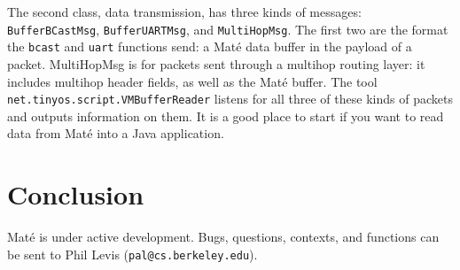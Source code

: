 \documentclass[12pt]{article}
\newcommand{\mate}{Mat\'{e}\xspace}
\begin{document}
The second class, data transmission, has three kinds of messages: {\tt
BufferBCastMsg}, {\tt BufferUARTMsg}, and {\tt MultiHopMsg}. The first
two are the format the {\tt bcast} and {\tt uart} functions send: a
\mate data buffer in the payload of a packet. MultiHopMsg is for
packets sent through a multihop routing layer: it includes multihop
header fields, as well as the \mate buffer. The tool {\tt
net.tinyos.script.VMBufferReader} listens for all three of these kinds
of packets and outputs information on them. It is a good place to
start if you want to read data from \mate into a Java application.


\section{Conclusion}

\mate is under active development. Bugs, questions, contexts, and
functions can be sent to Phil Levis ({\tt pal@cs.berkeley.edu}).
\end{document}

